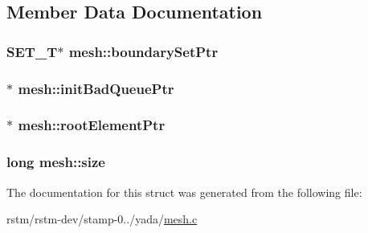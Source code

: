 \subsection{Member Data Documentation}
\hypertarget{structmesh_a5a4282113915f47cdd8b502a1a3e939a}{
\subsubsection[{boundary\-Set\-Ptr}]{\setlength{\rightskip}{0pt plus 5cm}S\-E\-T\-\_\-\-T$\ast$ mesh\-::boundary\-Set\-Ptr}}\label{structmesh_a5a4282113915f47cdd8b502a1a3e939a}
\hypertarget{structmesh_a0847d2acb6a5ff2de49318d9e615a814}{
\subsubsection[{init\-Bad\-Queue\-Ptr}]{$\ast$ mesh\-::init\-Bad\-Queue\-Ptr}}\label{structmesh_a0847d2acb6a5ff2de49318d9e615a814}
\hypertarget{structmesh_ab02e5e11b22030d16854bbeb18345175}{
\subsubsection[{root\-Element\-Ptr}]{$\ast$ mesh\-::root\-Element\-Ptr}}\label{structmesh_ab02e5e11b22030d16854bbeb18345175}
\hypertarget{structmesh_a250138529b18c349886b4749b406cd59}{
\subsubsection[{size}]{\setlength{\rightskip}{0pt plus 5cm}long mesh\-::size}}\label{structmesh_a250138529b18c349886b4749b406cd59}


The documentation for this struct was generated from the following file\-:\begin{DoxyCompactItemize}
\item 
rstm/rstm-\/dev/stamp-\/0../yada/\hyperlink{mesh_8c}{mesh.\-c}\end{DoxyCompactItemize}
